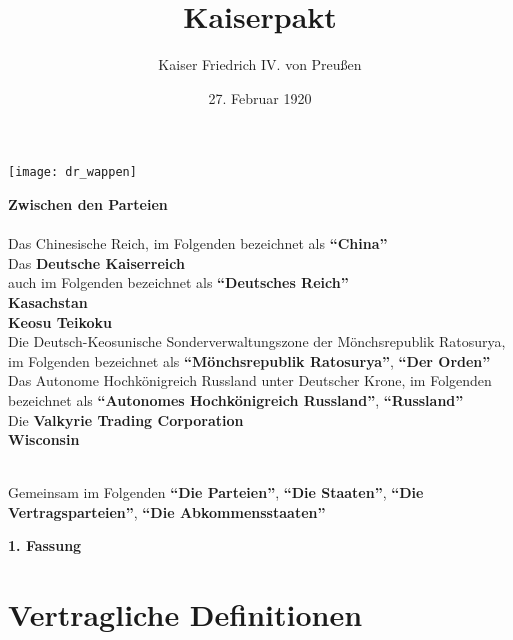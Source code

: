 \documentclass{article}
\title{Kaiserpakt}
\author{Kaiser Friedrich IV. von Preußen}
\date{27. Februar 1920}
\begin{document}
\maketitle
\begin{center}
    \texttt{[image: dr\_wappen]}
\end{center}
\begin{center}
    \textbf{Zwischen den Parteien\\}\textbf{\\}
    Das Chinesische Reich, im Folgenden bezeichnet als \textbf{``China''\\}
    Das \textbf{Deutsche Kaiserreich\\} auch im Folgenden bezeichnet als \textbf{``Deutsches Reich''\\}
    \textbf{Kasachstan\\}
    \textbf{Keosu Teikoku\\}
    Die Deutsch-Keosunische Sonderverwaltungszone der Mönchsrepublik Ratosurya, im Folgenden bezeichnet als \textbf{``Mönchsrepublik Ratosurya''}, \textbf{``Der Orden''\\}
    Das Autonome Hochkönigreich Russland unter Deutscher Krone, im Folgenden bezeichnet als \textbf{``Autonomes Hochkönigreich Russland''}, \textbf{``Russland''\\}
    Die \textbf{Valkyrie Trading Corporation\\}
    \textbf{Wisconsin\\}\textbf{\\}

    Gemeinsam im Folgenden \textbf{``Die Parteien''}, \textbf{``Die Staaten''}, \textbf{``Die Vertragsparteien''}, \textbf{``Die Abkommensstaaten''}
\end{center}
\newpage
{}
\vspace*{\fill}
\begin{Center}
\textbf{1. Fassung}
\vspace*{\fill}
\end{Center}
\newpage
\tableofcontents
\newpage
\section{Vertragliche Definitionen}
\end{document}
